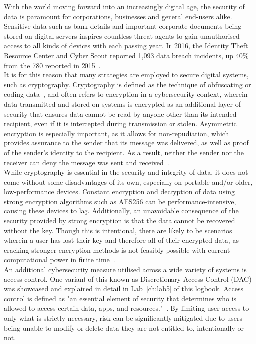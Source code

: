 \documentclass[12pt]{report}
\begin{document}
    With the world moving forward into an increasingly digital age, the security of data is paramount for
    corporations, businesses and general end-users alike.
    Sensitive data such as bank details and important corporate documents being stored on digital servers inspires
    countless threat agents to gain unauthorised access to all kinds of devices with each passing year.
    In 2016, the Identity Theft Resource Center and Cyber Scout reported 1,093 data breach incidents, up 40\%
    from the 780 reported in 2015~\autocite{DataBreaches}.\\

    \noindent It is for this reason that many strategies are employed to secure digital systems, such as cryptography.
    Cryptography is defined as the technique of obfuscating or coding data~\autocite{KSCryptography}, and often refers
    to encryption in a cybersecurity context, wherein data transmitted and stored on systems
    is encrypted as an additional layer of security that ensures data cannot be read by anyone other than its
    intended recipient, even if it is intercepted during transmission or stolen.
    Asymmetric encryption is especially important, as it allows for non-repudiation, which provides
    assurance to the sender that its message was delivered, as well as proof of the sender's identity to the recipient.
    As a result, neither the sender nor the receiver can deny the message was sent and received~\autocite{NR}.\\

    \noindent While cryptography is essential in the security and integrity of data, it does not come
    without some disadvantages of its own, especially on portable and/or older, low-performance devices.
    Constant encryption and decryption of data using strong encryption algorithms such as AES256 can be
    performance-intensive, causing these devices to lag.
    Additionally, an unavoidable consequence of the security provided by strong encryption is that the data
    cannot be recovered without the key.
    Though this is intentional, there are likely to be scenarios wherein a user has lost their key and therefore
    all of their encrypted data, as cracking stronger encryption methods is not feasibly possible with
    current computational power in finite time~\autocite{AESFinite}.\\

    \noindent An additional cybersecurity measure utilised across a wide variety of systems is access control.
    One variant of this known as Discretionary Access Control (DAC) was showcased and explained in detail
    in Lab~\ref{ch:lab5} of this logbook.
    Access control is defined as "an essential element of security that determines who is allowed to
    access certain data, apps, and resources."~\autocite{AccessControlMS}.
    By limiting user access to only what is strictly necessary, risk can be significantly mitigated due to
    users being unable to modify or delete data they are not entitled to, intentionally or not.\\
\end{document}
